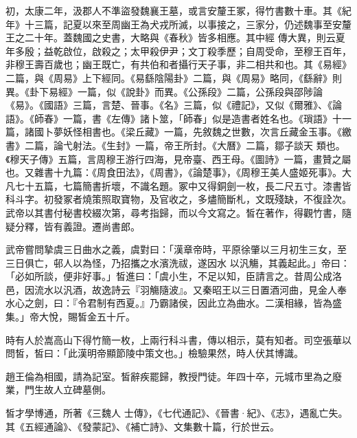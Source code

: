\begin{pinyinscope}
 初，太康二年，汲郡人不準盜發魏襄王墓，或言安釐王冢，得竹書數十車。其《紀年》十三篇，記夏以來至周幽王為犬戎所滅，以事接之，三家分，仍述魏事至安釐王之二十年。蓋魏國之史書，大略與《春秋》皆多相應。其中經
 傳大異，則云夏年多殷；益乾啟位，啟殺之；太甲殺伊尹；文丁殺季歷；自周受命，至穆王百年，非穆王壽百歲也；幽王既亡，有共伯和者攝行天子事，非二相共和也。其《易經》二篇，與《周易》上下經同。《易繇陰陽卦》二篇，與《周易》略同，《繇辭》則異。《卦下易經》一篇，似《說卦》而異。《公孫段》二篇，公孫段與邵陟論《易》。《國語》三篇，言楚、晉事。《名》三篇，似《禮記》，又似《爾雅》、《論語》。《師春》一篇，書《左傳》諸卜筮，「師春」似是造書者姓名也。《瑣語》十一篇，諸國卜夢妖怪相書也。《梁丘藏》一篇，先敘魏之世數，次言丘藏金玉事。《繳書》二篇，論弋射法。《生封》一篇，帝王所封。《大曆》二篇，鄒子談天
 類也。《穆天子傳》五篇，言周穆王游行四海，見帝臺、西王母。《圖詩》一篇，畫贊之屬也。又雜書十九篇：《周食田法》，《周書》，《論楚事》，《周穆王美人盛姬死事》。大凡七十五篇，七篇簡書折壞，不識名題。冢中又得銅劍一枚，長二尺五寸。漆書皆科斗字。初發冢者燒策照取寶物，及官收之，多燼簡斷札，文既殘缺，不復詮次。武帝以其書付秘書校綴次第，尋考指歸，而以今文寫之。皙在著作，得觀竹書，隨疑分釋，皆有義證。遷尚書郎。



 武帝嘗問摯虞三日曲水之義，虞對曰：「漢章帝時，平原徐肇以三月初生三女，至三日俱亡，邨人以為怪，乃招攜之水濱洗祓，遂因水
 以汎觴，其義起此。」帝曰：「必如所談，便非好事。」皙進曰：「虞小生，不足以知，臣請言之。昔周公成洛邑，因流水以汎酒，故逸詩云『羽觴隨波』。又秦昭王以三日置酒河曲，見金人奉水心之劍，曰：『令君制有西夏。』乃霸諸侯，因此立為曲水。二漢相緣，皆為盛集。」帝大悅，賜皙金五十斤。



 時有人於嵩高山下得竹簡一枚，上兩行科斗書，傳以相示，莫有知者。司空張華以問皙，皙曰：「此漢明帝顯節陵中策文也。」檢驗果然，時人伏其博識。



 趙王倫為相國，請為記室。皙辭疾罷歸，教授門徒。年四十卒，元城市里為之廢業，門生故人立碑墓側。



 皙才學博通，所著《三魏人
 士傳》，《七代通記》、《晉書·紀》、《志》，遇亂亡失。其《五經通論》、《發蒙記》、《補亡詩》、文集數十篇，行於世云。




\end{pinyinscope}
